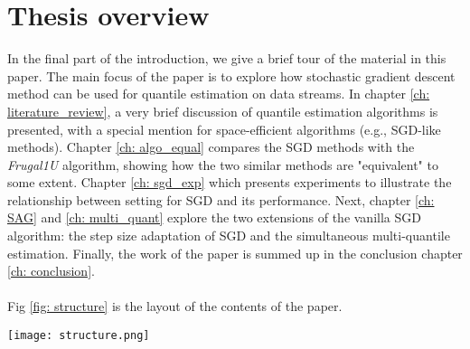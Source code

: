 \section{Thesis overview}
\label{sec: intro_overview}
In the final part of the introduction, we give a brief tour of the material in this paper.
The main focus of the paper is to explore how stochastic gradient descent method can be used for quantile estimation on data streams.
In chapter \ref{ch: literature_review}, a very brief discussion of quantile estimation algorithms is presented, with a special mention for space-efficient algorithms (e.g., SGD-like methods). 
Chapter \ref{ch: algo_equal} compares the SGD methods with the \textit{Frugal1U} algorithm\cite{maFrugalStreamingEstimating2014}, showing how the two similar methods are "equivalent" to some extent.
Chapter \ref{ch: sgd_exp} which presents experiments to illustrate the relationship between setting for SGD and its performance.
Next, chapter \ref{ch: SAG} and \ref{ch: multi_quant} explore the two extensions of the vanilla SGD algorithm: the step size adaptation of SGD and the simultaneous multi-quantile estimation. Finally, the work of the paper is summed up in the conclusion chapter \ref{ch: conclusion}.
\\\\
Fig \ref{fig: structure} is the layout of the contents of the paper.

\begin{figure*}[h!]
    \centering
	\texttt{[image: structure.png]}
    \caption{The relationship between topics covered in the thesis. Topics are roughly positioned along the top-bottom axis depending on where they are more close to SGD methods (left) or non-SGD methods (right). The arrows between the chapters represent are connected according to dependence.}
    \label{fig: structure}
\end{figure*}

